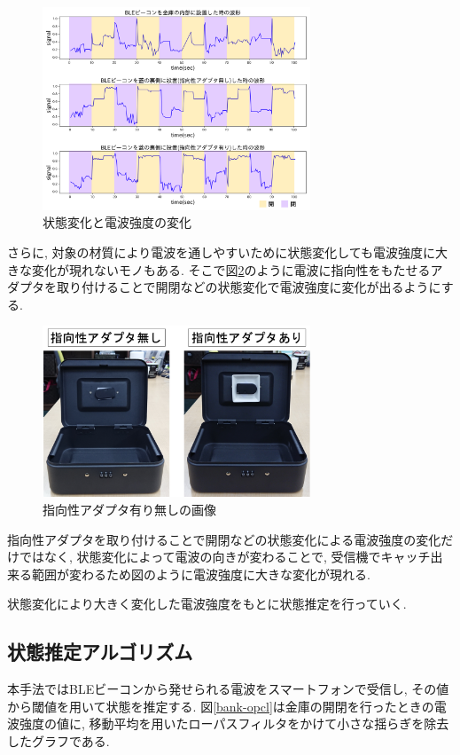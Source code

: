 \documentclass[Japanese]{dicomopapers}
\begin{document}
\begin{figure}[t]
 \centering
 \includegraphics[width=8cm]{in-out.png}
 \caption{状態変化と電波強度の変化}
 \label{transform-data}
\end{figure}

さらに, 対象の材質により電波を通しやすいために状態変化しても電波強度に大きな変化が現れないモノもある.
そこで図\ref{adapter}のように電波に指向性をもたせるアダプタを取り付けることで開閉などの状態変化で電波強度に変化が出るようにする.


\begin{figure}[ht]
 \centering
 \includegraphics[width=8cm]{adapta_compare.png}
 \caption{指向性アダプタ有り無しの画像}
 \label{adapter}
\end{figure}

指向性アダプタを取り付けることで開閉などの状態変化による電波強度の変化だけではなく, 状態変化によって電波の向きが変わることで, 受信機でキャッチ出来る範囲が変わるため図のように電波強度に大きな変化が現れる.

状態変化により大きく変化した電波強度をもとに状態推定を行っていく.

\subsection{状態推定アルゴリズム}
本手法ではBLEビーコンから発せられる電波をスマートフォンで受信し, その値から閾値を用いて状態を推定する.
図\ref{bank-opcl}は金庫の開閉を行ったときの電波強度の値に, 移動平均を用いたローパスフィルタをかけて小さな揺らぎを除去したグラフである.
\end{document}
